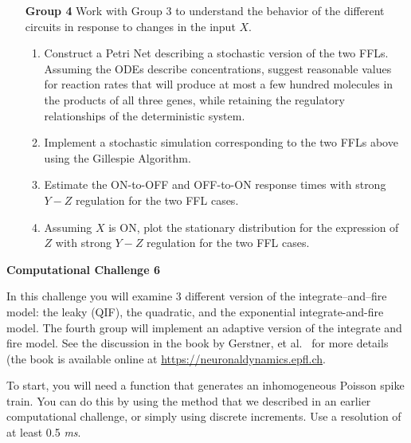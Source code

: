 \documentclass[12pt]{article}
\begin{document}
\begin{enumerate}
\item[\bf Group 4] Work with Group 3 to understand the behavior of the different circuits in response to changes in the input $X$.

\begin{enumerate}
\item Construct a Petri Net describing a stochastic version of the two FFLs. Assuming the ODEs describe concentrations, suggest reasonable values for reaction rates that will produce at most a few hundred molecules in the products of all three genes, while retaining the regulatory relationships of the deterministic system.
\item Implement a stochastic simulation corresponding to the two FFLs above using the Gillespie Algorithm. 
\item Estimate the ON-to-OFF and OFF-to-ON response times with strong $Y-Z$ regulation for the two FFL cases.
\item Assuming $X$ is ON, plot the stationary distribution for the expression of $Z$ with strong $Y-Z$ regulation for the two FFL cases.

\end{enumerate}

\end{enumerate}


\clearpage


\begin{center}
{\Large \bf Computational Challenge 6
\\ \vskip5mm }
\end{center}



In this challenge you will examine 3 different version of the integrate--and--fire model: the leaky (QIF), the quadratic,
and the exponential integrate-and-fire model. The fourth group will implement an adaptive version of the integrate and fire model.
See the discussion in the book by Gerstner,  et al.~\cite{gerstner14} for more details (the book is available online at
\url{https://neuronaldynamics.epfl.ch}.

To start, you will need a function that generates an inhomogeneous Poisson spike train. You can do this by using
the method that we described in an earlier computational challenge, or simply using discrete increments.  Use a resolution
of at least 0.5 \emph{ms}.   
\end{document}
